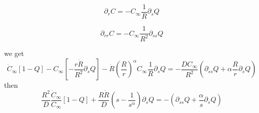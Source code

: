 \documentclass[11pt]{revtex4}
\begin{document}
\begin{equation}
	\partial_r C = - C_\infty \dfrac{1}{R} \partial_s Q
\end{equation}

\begin{equation}
	\partial_{rr} C = - C_\infty \dfrac{1}{R^2} \partial_{ss} Q
\end{equation}

we get
\begin{equation}
	 \dot{C}_\infty \left[1-Q\right] - C_\infty \left[ -\dfrac{r\dot{R}}{R^2} \partial_s Q \right] 
	 - \dot{R} \left(\dfrac{R}{r}\right)^\alpha  C_\infty \dfrac{1}{R} \partial_s Q =
	  - \dfrac{DC_\infty}{R^2} \left(\partial_{ss} Q + \alpha \dfrac{R}{r} \partial_s Q\right)
\end{equation}
then
\begin{equation}
	\dfrac{R^2}{D}\dfrac{ \dot{C}_\infty}{C_\infty}\left[1-Q\right] + \dfrac{R\dot{R}}{D}\left(s-\dfrac{1}{s^\alpha}\right)\partial_s Q =  - \left(\partial_{ss}Q + \dfrac{\alpha}{s} \partial_s{Q}\right)
\end{equation}
\end{document}
